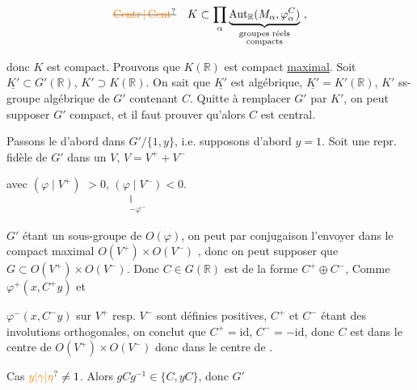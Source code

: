 \[
\deleted{\unsure{\operatorname{Centr}|\operatorname{Cent}}}\quad K\subset\prod_\alpha\underbrace{\operatorname{Aut}_{\mathbb R}(M_\alpha,\varphi_\alpha^C)}_{\substack{\text{groupes réels}\\\text{compacts}}}\ ,
\]

donc $K$ est  compact. Prouvons que  $K(\mathbb R)$ est compact \uline{maximal}. Soit  $\underline{K'}\subset G'(\mathbb R)$, $K'\supset K(\mathbb R)$. On sait que $\underline{K'}$ est algébrique, $\underline{K'}=K'(\mathbb R)$, $K'$ ss-groupe algébrique de $G'$ contenant $C$. Quitte à remplacer $G'$ par $K'$, on peut supposer $G'$ compact, et il faut prouver qu'alors $C$ est central.

Passons le d'abord dans $G'/\{1,y\}$, i.e. supposons d'abord $y=1$. Soit une repr. fidèle de $G'$ dans un $V$,    $V=V^++V^-$

 avec $(\varphi\mid V^+)$  $>0$, $\underset{\substack{\Vert\\-\varphi^-}}{(\varphi\mid V^-)}<0$.

\deleted{\unsure{$\varepsilon$}} $G'$ étant un sous-groupe  de $O(\varphi)$, on peut par conjugaison  l'envoyer dans le compact maximal $O(V^+)\times O(V^-)$ , donc on peut supposer que $G\subset O(V^+)\times O(V^-)$. Donc $C\in G(\mathbb R)$ est de la forme $C^+\oplus C^-$,  Comme $\varphi^+(x,C^+y)$ et


$\varphi^-(x,C^-y)$ sur $V^+$ resp. $V^-$ sont définies positives, $C^+$ et $C^-$ étant des  involutions orthogonales, on conclut que $C^+=\mathrm{id}$, $C^-=-\mathrm{id}$, donc $C$ est dans le centre de  $O(V^+)\times O(V^-)$ donc dans le centre de .

Cas $\unsure{y|\gamma|\eta}\ne1$. Alors $gCg^{-1}\in\{C,yC\}$, donc $G'$   


